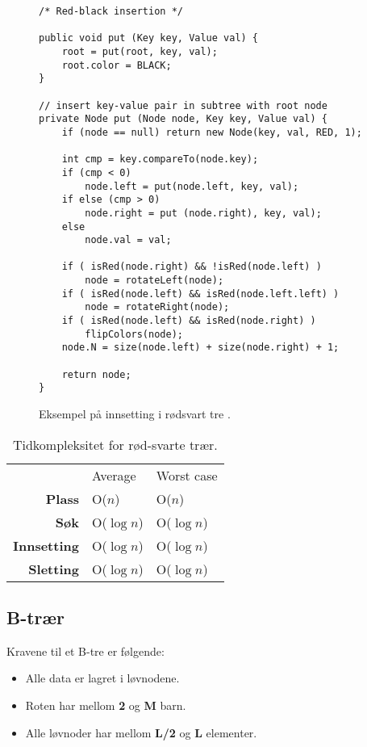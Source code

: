 \documentclass[11pt,a4paper]{article}
\theoremstyle{def}
\begin{document}
\begin{figure}[h!]
\begin{lstlisting}[frame=single]
/* Red-black insertion */

public void put (Key key, Value val) {
	root = put(root, key, val);
	root.color = BLACK;
}

// insert key-value pair in subtree with root node
private Node put (Node node, Key key, Value val) {
	if (node == null) return new Node(key, val, RED, 1);

	int cmp = key.compareTo(node.key);
	if (cmp < 0) 
		node.left = put(node.left, key, val);
	if else (cmp > 0)
		node.right = put (node.right), key, val);
	else 
		node.val = val;

	if ( isRed(node.right) && !isRed(node.left) ) 
		node = rotateLeft(node);
	if ( isRed(node.left) && isRed(node.left.left) ) 
		node = rotateRight(node);
	if ( isRed(node.left) && isRed(node.right) ) 
		flipColors(node);
	node.N = size(node.left) + size(node.right) + 1;

	return node;
}
\end{lstlisting}
\vspace{-15pt}
\caption{Eksempel på innsetting i rødsvart tre \cite{redblack}.}
\end{figure}

\begin{table}[h!]
\centering
\begin{tabular}{rll}
&Average&Worst case\\
\textbf{Plass} & O($n$) & O($n$)\\
\textbf{Søk} & O($\log n$) & O($\log n$)\\
\textbf{Innsetting} & O($\log n$) & O($\log n$)\\
\textbf{Sletting} & O($\log n$) & O($\log n$)\\
\end{tabular}
\label{tab:obst}
\caption{Tidkompleksitet for rød-svarte trær.}
\end{table}

\newpage

\subsection{B-trær}

Kravene til et B-tre er følgende:
\begin{itemize}
\item
Alle data er lagret i løvnodene.
\item
Roten har mellom \textbf{2} og \textbf{M} barn. 
\item
Alle løvnoder har mellom \textbf{L/2} og \textbf{L} elementer.
\end{itemize}
\end{document}
